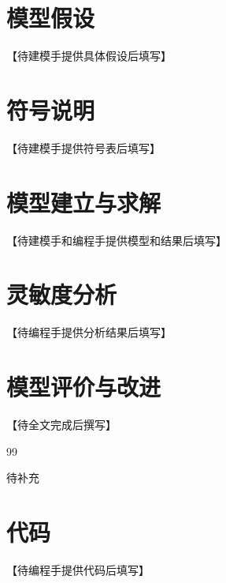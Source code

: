 \documentclass[12pt,a4paper]{ctexart}
\begin{document}
\section{模型假设}

【待建模手提供具体假设后填写】

\section{符号说明}

【待建模手提供符号表后填写】

\section{模型建立与求解}

【待建模手和编程手提供模型和结果后填写】

\section{灵敏度分析}

【待编程手提供分析结果后填写】

\section{模型评价与改进}

【待全文完成后撰写】

\newpage
\begin{thebibliography}{99}

 待补充

\end{thebibliography}

\newpage
\appendix

\section{代码}

【待编程手提供代码后填写】
\end{document}
